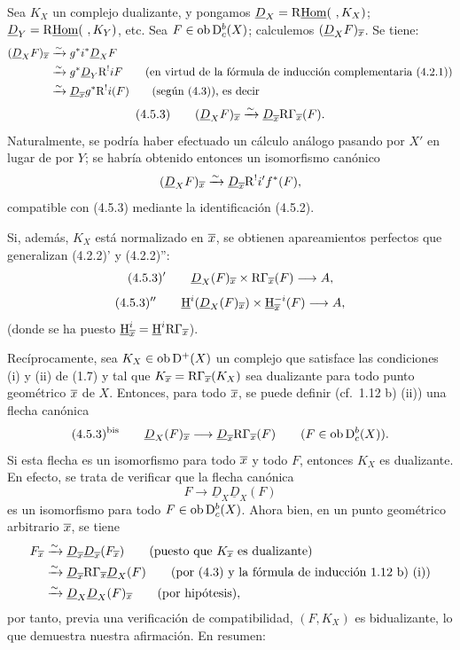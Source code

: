 Sea $K_X$ un complejo dualizante, y pongamos $\underline{D}_X=\mathrm{R}\underline{\operatorname{Hom}}(\ ,K_X)$; $\underline{D}_Y=\R\underline{\Hom}(\ ,K_Y)$, etc. Sea $F\in\operatorname{ob}\mathrm{D}_c^b(X)$; calculemos $(\underline{D}_XF)_{\overline{x}}$. Se tiene:
\[
\begin{aligned}
(\underline{D}_XF)_{\overline{x}}&\xrightarrow{\sim}g^*i^*\underline{D}_X F\\
&\xrightarrow{\sim}g^*\underline{D}_Y\mathrm{R}^{!}iF\qquad\text{(en virtud de la fórmula de inducción complementaria (4.2.1))}\\
&\xrightarrow{\sim}\underline{D}_{\overline{x}}g^*\mathrm{R}^{!}i(F)\qquad\text{(según (4.3)), es decir}
\end{aligned}
\]
\[
(4.5.3)\qquad (\underline{D}_X F)_{\overline{x}}\xrightarrow{\sim}\underline{D}_{\overline{x}}\mathrm{R}\Gamma_{\overline{x}}(F).
\]
Naturalmente, se podría haber efectuado un cálculo análogo pasando por $X'$ en lugar de por $Y$; se habría obtenido entonces un isomorfismo canónico
\[
(\underline{D}_XF)_{\overline{x}}\xrightarrow{\sim}\underline{D}_{\overline{x}}\mathrm{R}^{!}i'f^*(F),
\]
compatible con (4.5.3) mediante la identificación (4.5.2).

Si, además, $K_X$ está normalizado en $\overline{x}$, se obtienen apareamientos perfectos que generalizan (4.2.2)' y (4.2.2)'':
\[
(4.5.3)'\qquad \underline{D}_X(F)_{\overline{x}}\times \mathrm{R}\Gamma_{\overline{x}}(F)\longrightarrow A,
\]
\[
(4.5.3)''\qquad \underline{\mathrm H}^i(\underline{D}_X(F)_{\overline{x}})\times \underline{\mathrm H}_{\overline{x}}^{-i}(F)\longrightarrow A,
\]
(donde se ha puesto $\underline{\mathrm H}_{\overline{x}}^i=\underline{\mathrm H}^i\mathrm{R}\Gamma_{\overline{x}}$).

Recíprocamente, sea $K_X\in\operatorname{ob}\mathrm{D}^+(X)$ un complejo que satisface las condiciones (i) y (ii) de (1.7) y tal que $K_{\overline{x}}=\mathrm{R}\Gamma_{\overline{x}}(K_X)$ sea dualizante para todo punto geométrico $\overline{x}$ de $X$. Entonces, para todo $\overline{x}$, se puede definir (cf.~1.12 b) (ii)) una flecha canónica
\[
(4.5.3)^{\mathrm{bis}}\qquad \underline{D}_X(F)_{\overline{x}}\longrightarrow \underline{D}_{\overline{x}}\mathrm{R}\Gamma_{\overline{x}}(F)\qquad (F\in\operatorname{ob}\mathrm{D}_c^b(X)).
\]
Si esta flecha es un isomorfismo para todo $\overline{x}$ y todo $F$, entonces $K_X$ es dualizante. En efecto, se trata de verificar que la flecha canónica
\[
F\longrightarrow \underline{D}_X\underline{D}_X(F)
\]
es un isomorfismo para todo $F\in\operatorname{ob}\mathrm{D}_c^b(X)$. Ahora bien, en un punto geométrico arbitrario $\overline{x}$, se tiene
\[
\begin{aligned}
F_{\overline{x}}&\xrightarrow{\sim}\underline{D}_{\overline{x}}\underline{D}_{\overline{x}}(F_{\overline{x}})\qquad\text{(puesto que $K_{\overline{x}}$ es dualizante)}\\
&\xrightarrow{\sim}\underline{D}_{\overline{x}}\mathrm{R}\Gamma_{\overline{x}}\underline{D}_X(F)\qquad\text{(por (4.3) y la fórmula de inducción 1.12 b) (i))}\\
&\xrightarrow{\sim}\underline{D}_X\underline{D}_X(F)_{\overline{x}}\qquad\text{(por hipótesis)},
\end{aligned}
\]
por tanto, previa una verificación de compatibilidad, $(F,K_X)$ es bidualizante, lo que demuestra nuestra afirmación. En resumen:

